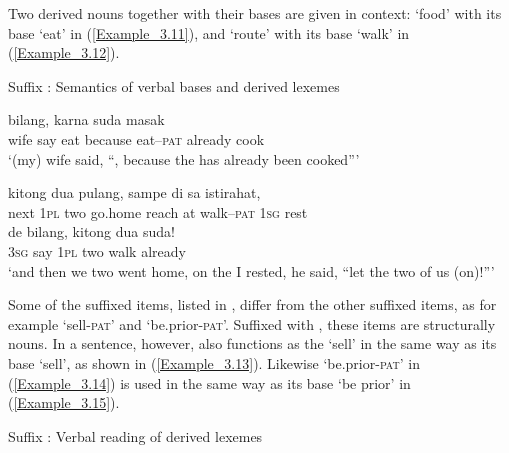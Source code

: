 Two derived nouns together with their bases are given in context:  ‘food’ with its  base  ‘eat’ in (\ref{Example_3.11}), and  ‘route’ with its  base  ‘walk’ in (\ref{Example_3.12}).


\newpage
\begin{styleExampleTitle}
{Suffix : Semantics of verbal bases and derived lexemes}
\end{styleExampleTitle}

\ea
\label{Example_3.11}
 {bilang,} {} {karna} {} {suda} {masak}\\ %
 wife  say  eat  because  eat–\textsc{pat}  already  cook\\
\glt 
‘(my) wife said, ``, because the  has already been cooked''’ \textstyleExampleSource{[080919-004-NP.0039]}
\z

\ea
\label{Example_3.12}
 {kitong} {dua} {{pulang,}} {{sampe}} {di} {} {sa} {istirahat,}\\ %
 {next}  \textsc{1pl}  two  {go.home}  {reach}  at  walk–\textsc{pat}  \textsc{1sg}  rest\\
\gll  de  {bilang,}  {kitong}  dua  {}  {suda!}\\
 \textsc{3sg}  {say}  {\textsc{1pl}}  two  {walk}  {already}\\
\glt 
‘and then we two went home, on the  I rested, he said, ``let the two of us  (on)!''’ \textstyleExampleSource{[081015-005-NP.0036]}
\z


Some of the suffixed items, listed in , differ from the other suffixed items, as for example  ‘sell-\textsc{pat}’ and  ‘be.prior-\textsc{pat}’. Suffixed with , these items are structurally nouns. In a sentence, however,  also functions as the  ‘sell’ in the same way as its base  ‘sell’, as shown in (\ref{Example_3.13}). Likewise  ‘be.prior-\textsc{pat}’ in (\ref{Example_3.14}) is used in the same way as its base  ‘be prior’ in (\ref{Example_3.15}).



\begin{styleExampleTitle}
{Suffix : Verbal reading of derived lexemes}
\end{styleExampleTitle}

